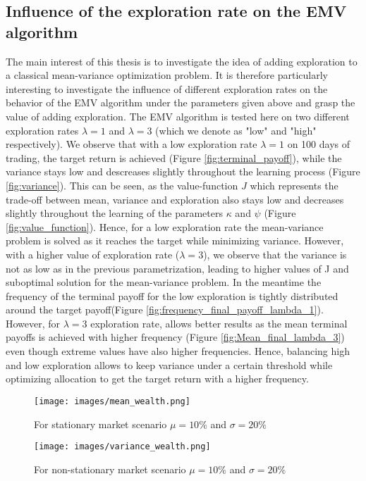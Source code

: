 \documentclass[oneside, a4paper, onecolumn, 11pt]{article}
\begin{document}
\subsection{Influence of the exploration rate on the EMV algorithm}
The main interest of this  thesis is to investigate the idea of adding exploration to a classical mean-variance optimization problem. It is therefore particularly interesting to investigate the influence of different exploration rates on the behavior of the EMV algorithm under the parameters given above and grasp the value of adding exploration. The EMV algorithm is tested here on two different exploration rates $\lambda = 1$ and $\lambda = 3$ (which we denote as "low" and "high" respectively).   
 We observe that with a low exploration rate $\lambda = 1$ on 100 days of trading, the target return is achieved (Figure \eqref{fig:terminal_payoff}), while the variance stays low and descreases slightly throughout the learning process (Figure \eqref{fig:variance}). This can be seen, as the value-function $J$ which represents the trade-off between mean, variance and exploration also stays low and decreases slightly throughout the learning of the parameters $\kappa$ and $\psi$ (Figure \eqref{fig:value_function}).
Hence, for a low exploration rate the mean-variance problem is solved as it reaches the target while minimizing variance. 
However, with a higher value of exploration rate ($\lambda = 3$), we observe that the variance is not as low as in the previous parametrization, leading to higher values of J and suboptimal solution for the mean-variance problem.  
In the meantime the frequency of the terminal payoff for the low exploration is tightly distributed around the target payoff(Figure \eqref{fig:frequency_final_payoff_lambda_1}). However, for $\lambda  = 3$ exploration rate, allows better results as the mean terminal payoffs is achieved with higher frequency (Figure \eqref{fig:Mean_final_lambda_3}) even though extreme values have also  higher frequencies. Hence, balancing high and low exploration allows to keep variance under a certain threshold while optimizing allocation to get the target return with a higher frequency.
\begin{figure}[ht] %
    \centering
    \texttt{[image: images/mean\_wealth.png]} %
    \caption{For stationary market scenario $\mu=10\%$ and $\sigma = 20\%$}
    \label{fig:terminal_payoff}
\end{figure}
\begin{figure}[ht] %
    \centering
    \texttt{[image: images/variance\_wealth.png]} %
    \caption{For non-stationary market scenario $\mu=10\%$ and $\sigma = 20\%$}
    \label{fig:variance}
\end{figure}
\end{document}
